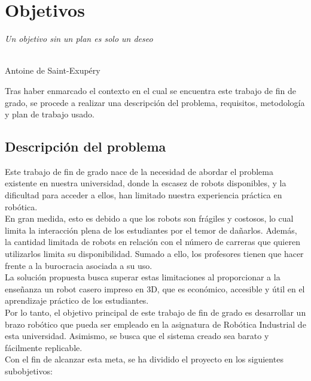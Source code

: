 \chapter{Objetivos}
\label{cap:capitulo3}

\begin{flushright}
\begin{minipage}[]{10cm}
\emph{Un objetivo sin un plan es solo un deseo}\\
\end{minipage}\\

Antoine de Saint-Exupéry\\
\end{flushright}

\vspace{1cm}

Tras haber enmarcado el contexto en el cual se encuentra este trabajo de fin de grado, se procede a realizar
una descripción del problema, requisitos, metodología y plan de trabajo usado.
\section{Descripción del problema}
\label{sec:descripcion}
Este trabajo de fin de grado nace de la necesidad de abordar el problema existente en nuestra universidad, donde la escasez de 
robots disponibles, y la dificultad para acceder a ellos, han limitado nuestra experiencia práctica en robótica. 
\\
En gran medida, esto es debido a que los robots son frágiles y costosos, lo cual limita la interacción plena de los estudiantes 
por el temor de dañarlos. Además, la cantidad limitada de robots en relación con el número de carreras que 
quieren utilizarlos limita su disponibilidad. Sumado a ello, los profesores tienen que hacer frente a la burocracia asociada a su uso.
\\ 
La solución propuesta busca superar estas limitaciones al proporcionar a la enseñanza un robot casero impreso en 3D, que es
económico, accesible y útil en el aprendizaje práctico de los estudiantes. 
\\
Por lo tanto, el objetivo principal de este trabajo de fin de grado es desarrollar un brazo robótico que pueda ser empleado en la 
asignatura de Robótica Industrial de esta universidad. Asimismo, se busca que el sistema creado sea barato y fácilmente replicable.
\\
Con el fin de alcanzar esta meta, se ha dividido el proyecto en los siguientes subobjetivos:

